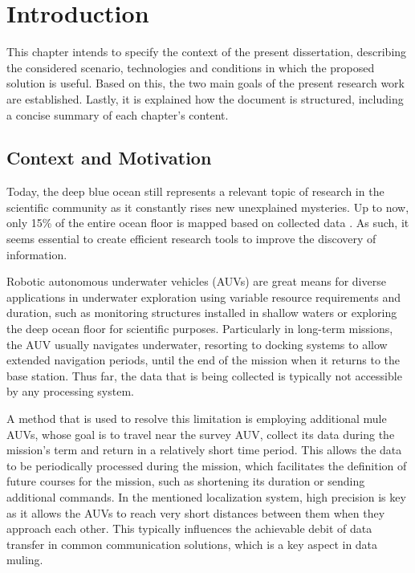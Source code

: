 \chapter{Introduction} \label{chap:intro}

This chapter intends to specify the context of the present dissertation, describing the considered scenario, technologies and conditions in which the proposed solution is useful. Based on this, the two main goals of the present research work are established. Lastly, it is explained how the document is structured, including a concise summary of each chapter's content.

\section{Context and Motivation} \label{sec:context}

Today, the deep blue ocean still represents a relevant topic of research in the scientific community as it constantly rises new unexplained mysteries. Up to now, only 15\% of the entire ocean floor is mapped based on collected data \cite{deeperblue}. As such, it seems essential to create efficient research tools to improve the discovery of information.

Robotic autonomous underwater vehicles (AUVs) are great means for diverse applications in underwater exploration using variable resource requirements and duration, such as monitoring structures installed in shallow waters or exploring the deep ocean floor for scientific purposes. Particularly in long-term missions, the AUV usually navigates underwater, resorting to docking systems to allow extended navigation periods, until the end of the mission when it returns to the base station. Thus far, the data that is being collected is typically not accessible by any processing system. 

A method that is used to resolve this limitation is employing additional mule AUVs, whose goal is to travel near the survey AUV, collect its data during the mission's term and return in a relatively short time period. This allows the data to be periodically processed during the mission, which facilitates the definition of future courses for the mission, such as shortening its duration or sending additional commands. In the mentioned localization system, high precision is key as it allows the AUVs to reach very short distances between them when they approach each other. This typically influences the achievable debit of data transfer in common communication solutions, which is a key aspect in data muling.

